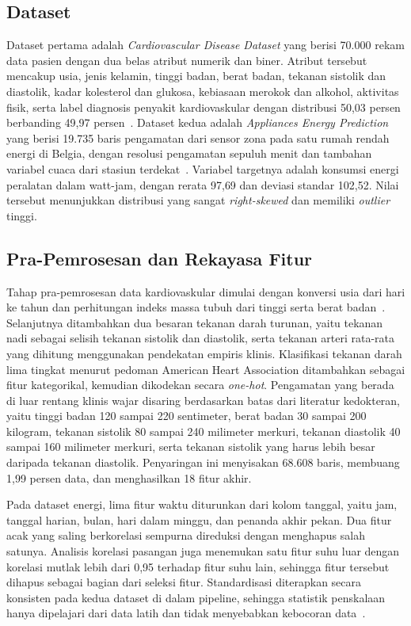 \documentclass[conference]{IEEEtran}
\begin{document}
\subsection{Dataset}
Dataset pertama adalah \textit{Cardiovascular Disease Dataset} yang berisi 70.000 rekam data pasien dengan dua belas atribut numerik dan biner. Atribut tersebut mencakup usia, jenis kelamin, tinggi badan, berat badan, tekanan sistolik dan diastolik, kadar kolesterol dan glukosa, kebiasaan merokok dan alkohol, aktivitas fisik, serta label diagnosis penyakit kardiovaskular dengan distribusi 50{,}03 persen berbanding 49{,}97 persen~\cite{Sulianova2018Cardio}. Dataset kedua adalah \textit{Appliances Energy Prediction} yang berisi 19.735 baris pengamatan dari sensor zona pada satu rumah rendah energi di Belgia, dengan resolusi pengamatan sepuluh menit dan tambahan variabel cuaca dari stasiun terdekat~\cite{Candanedo2017,Dua2019UCI}. Variabel targetnya adalah konsumsi energi peralatan dalam watt-jam, dengan rerata 97{,}69 dan deviasi standar 102{,}52. Nilai tersebut menunjukkan distribusi yang sangat \textit{right-skewed} dan memiliki \textit{outlier} tinggi.

\subsection{Pra-Pemrosesan dan Rekayasa Fitur}
Tahap pra-pemrosesan data kardiovaskular dimulai dengan konversi usia dari hari ke tahun dan perhitungan indeks massa tubuh dari tinggi serta berat badan~\cite{KhanIcmla2020}. Selanjutnya ditambahkan dua besaran tekanan darah turunan, yaitu tekanan nadi sebagai selisih tekanan sistolik dan diastolik, serta tekanan arteri rata-rata yang dihitung menggunakan pendekatan empiris klinis. Klasifikasi tekanan darah lima tingkat menurut pedoman American Heart Association ditambahkan sebagai fitur kategorikal, kemudian dikodekan secara \textit{one-hot}. Pengamatan yang berada di luar rentang klinis wajar disaring berdasarkan batas dari literatur kedokteran, yaitu tinggi badan 120 sampai 220 sentimeter, berat badan 30 sampai 200 kilogram, tekanan sistolik 80 sampai 240 milimeter merkuri, tekanan diastolik 40 sampai 160 milimeter merkuri, serta tekanan sistolik yang harus lebih besar daripada tekanan diastolik. Penyaringan ini menyisakan 68.608 baris, membuang 1{,}99 persen data, dan menghasilkan 18 fitur akhir.

Pada dataset energi, lima fitur waktu diturunkan dari kolom tanggal, yaitu jam, tanggal harian, bulan, hari dalam minggu, dan penanda akhir pekan. Dua fitur acak yang saling berkorelasi sempurna direduksi dengan menghapus salah satunya. Analisis korelasi pasangan juga menemukan satu fitur suhu luar dengan korelasi mutlak lebih dari 0{,}95 terhadap fitur suhu lain, sehingga fitur tersebut dihapus sebagai bagian dari seleksi fitur. Standardisasi diterapkan secara konsisten pada kedua dataset di dalam pipeline, sehingga statistik penskalaan hanya dipelajari dari data latih dan tidak menyebabkan kebocoran data~\cite{Pedregosa2011}.
\end{document}
